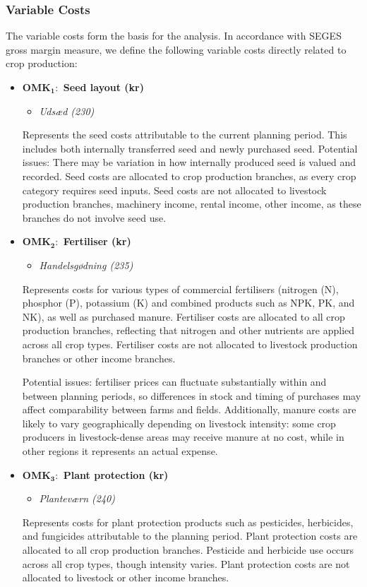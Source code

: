\documentclass[12pt]{article}
\begin{document}
\subsubsection{Variable Costs} 
The variable costs form the basis for the analysis. 
In accordance with SEGES gross margin measure, we define the following variable costs directly related to crop production:
\begin{itemize}
    \item[] \textbf{OMK$_\textbf{1}:$ Seed layout (kr)}
    \begin{itemize}
        \item[$+$] \textit{Udsæd (230)}
    \end{itemize}
    Represents the seed costs attributable to the current planning period. 
    This includes both internally transferred seed and newly purchased seed.
    Potential issues: There may be variation in how internally produced seed is valued and recorded. 
    Seed costs are allocated to crop production branches, as every crop category requires seed inputs. 
    Seed costs are not allocated to livestock production branches, machinery income, rental income, other income, as these branches do not involve seed use.
    
    \item[] \textbf{OMK$_\textbf{2}:$ Fertiliser (kr)}   \begin{itemize}
        \item[$+$] \textit{Handelsgødning (235)}
    \end{itemize}
    Represents costs for various types of commercial fertilisers (nitrogen (N), phosphor (P), potassium (K) and combined products such as NPK, PK, and NK), as well as purchased manure.
    Fertiliser costs are allocated to all crop production branches, reflecting that nitrogen and other nutrients are applied across all crop types. 
    Fertiliser costs are not allocated to livestock production branches or other income branches.
    
    Potential issues: fertiliser prices can fluctuate substantially within and between planning periods, so differences in stock and timing of purchases may affect comparability between farms and fields. 
    Additionally, manure costs are likely to vary geographically depending on livestock intensity: some crop producers in livestock-dense areas may receive manure at no cost, while in other regions it represents an actual expense.

    \item[] \textbf{OMK$_\textbf{3}:$ Plant protection (kr)}
    \begin{itemize}
        \item[$+$] \textit{Planteværn (240)}
    \end{itemize}
    Represents costs for plant protection products such as pesticides, herbicides, and fungicides attributable to the planning period.
    Plant protection costs are allocated to all crop production branches. 
    Pesticide and herbicide use occurs across all crop types, though intensity varies. 
    Plant protection costs are not allocated to livestock or other income branches.


\end{itemize}
\end{document}
